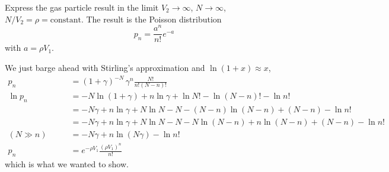 

Express the gas particle result in the limit $V_2 \rightarrow \infty$, $N \rightarrow \infty$, $N/V_2 = \rho = \text{constant}$.
The result is the Poisson distribution
\begin{equation*}
  p_n = \frac{a^n}{n!} e^{-a}
\end{equation*}
with $a = \rho V_1$.


We just barge ahead with Stirling's approximation and $\ln(1+x) \approx x$,
\begin{align*}
  p_n
  &= (1 + \gamma)^{-N} \, \gamma^n \frac{N!}{n! (N - n)!} \\
  \ln p_n
  &= -N \ln (1 + \gamma) + n \ln \gamma + \ln N! - \ln (N - n)! - \ln n! \\
  &= -N \gamma + n \ln \gamma + N \ln N - N - (N - n)\ln(N - n) + (N - n) - \ln n! \\
  &= -N \gamma + n \ln \gamma + N \ln N - N - N \ln(N - n) + n \ln(N - n) + (N - n) - \ln n! \\
  (N \gg n) \qquad
  &= -N \gamma + n \ln (N \gamma) - \ln n! \\
  p_n
  &= e^{-\rho V_1} \frac{(\rho V_1)^n}{n!}
\end{align*}
which is what we wanted to show.
